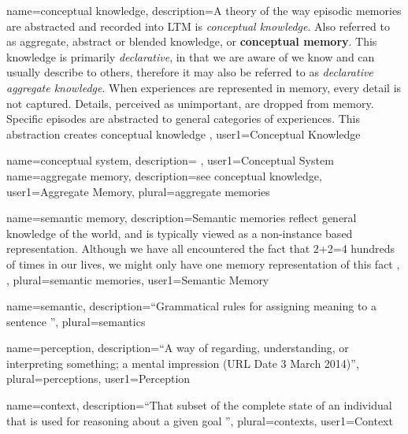 {
  name=conceptual knowledge,
  description={A theory of the way episodic memories are abstracted and recorded into
    \gls{LTM} is \emph{conceptual knowledge}.
    Also referred to as aggregate, abstract or blended knowledge, or \textbf{conceptual memory}.
    This knowledge is primarily \emph{declarative}, in that we are aware of we know and can usually describe to others, therefore it may also be referred to as \emph{declarative aggregate knowledge}.
    When experiences are represented in memory, every detail is not captured. Details, perceived as unimportant, are dropped from memory. Specific episodes are abstracted to general categories of experiences.  This \gls{abstraction} creates
    conceptual knowledge \citep{anderson2005cognitive}},
  user1={Conceptual Knowledge}
}

{
  name=conceptual system,
  description={ \citep{tononi2008consciousness}},
  user1={Conceptual System}
}
{
  name=aggregate memory,
  description={see \gls{conceptual knowledge}},
  user1={Aggregate Memory},
  plural={aggregate memories}
}


{
  name=semantic memory,
  description={Semantic memories reflect general knowledge of the world, and is typically viewed as a non-instance based representation. Although we have all encountered the fact that 2+2=4 hundreds of times in our lives, we might only have one memory representation of this fact \citep[240]{anderson2005cognitive}, \citep{sims2004episodic}},
  plural=semantic memories,
  user1={Semantic Memory}
}

{
  name=semantic,
  description={``Grammatical rules for assigning meaning to a sentence \citep[352]{anderson2005cognitive} ''},
  plural=semantics
}

{
  name=perception,
  description={``A way of regarding, understanding, or interpreting something; a mental impression \citep{Oxford2014} (URL Date 3 March 2014)''},
  plural=perceptions,
  user1={Perception}
}

{
  name=context,
  description={``That subset of the complete state of an individual that is used for reasoning about a given goal \citep{giunchiglia1993contextual}''},
  plural=contexts,
  user1={Context}
}

